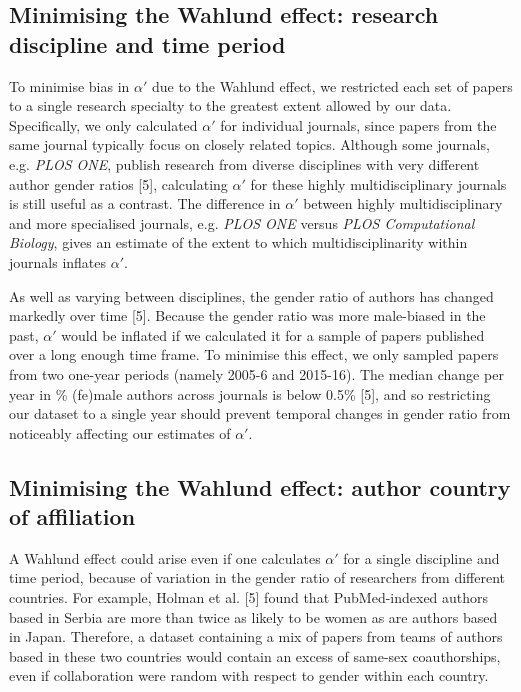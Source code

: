 \documentclass[12pt,]{article}
\begin{document}
\hypertarget{minimising-the-wahlund-effect-research-discipline-and-time-period}{%
\subsection{Minimising the Wahlund effect: research discipline and time
period}\label{minimising-the-wahlund-effect-research-discipline-and-time-period}}

To minimise bias in \(\alpha'\) due to the Wahlund effect, we restricted
each set of papers to a single research specialty to the greatest extent
allowed by our data. Specifically, we only calculated \(\alpha'\) for
individual journals, since papers from the same journal typically focus
on closely related topics. Although some journals, e.g. \emph{PLOS ONE},
publish research from diverse disciplines with very different author
gender ratios {[}5{]}, calculating \(\alpha'\) for these highly
multidisciplinary journals is still useful as a contrast. The difference
in \(\alpha'\) between highly multidisciplinary and more specialised
journals, e.g. \emph{PLOS ONE} versus \emph{PLOS Computational Biology},
gives an estimate of the extent to which multidisciplinarity within
journals inflates \(\alpha'\).

As well as varying between disciplines, the gender ratio of authors has
changed markedly over time {[}5{]}. Because the gender ratio was more
male-biased in the past, \(\alpha'\) would be inflated if we calculated
it for a sample of papers published over a long enough time frame. To
minimise this effect, we only sampled papers from two one-year periods
(namely 2005-6 and 2015-16). The median change per year in \% (fe)male
authors across journals is below 0.5\% {[}5{]}, and so restricting our
dataset to a single year should prevent temporal changes in gender ratio
from noticeably affecting our estimates of \(\alpha'\).

\hypertarget{minimising-the-wahlund-effect-author-country-of-affiliation}{%
\subsection{Minimising the Wahlund effect: author country of
affiliation}\label{minimising-the-wahlund-effect-author-country-of-affiliation}}

A Wahlund effect could arise even if one calculates \(\alpha'\) for a
single discipline and time period, because of variation in the gender
ratio of researchers from different countries. For example, Holman et
al. {[}5{]} found that PubMed-indexed authors based in Serbia are more
than twice as likely to be women as are authors based in Japan.
Therefore, a dataset containing a mix of papers from teams of authors
based in these two countries would contain an excess of same-sex
coauthorships, even if collaboration were random with respect to gender
within each country.
\end{document}
